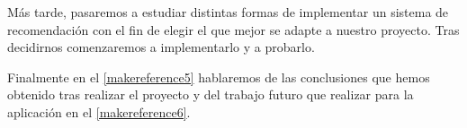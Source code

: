 Más tarde, pasaremos a estudiar distintas formas de implementar un sistema
 de recomendación con el fin de elegir el que mejor se adapte a nuestro
 proyecto. Tras decidirnos comenzaremos a implementarlo y a probarlo.

Finalmente en el \autoref{makereference5} hablaremos de las conclusiones que
 hemos obtenido tras realizar el proyecto y del trabajo futuro que realizar para
 la aplicación en el \autoref{makereference6}.
